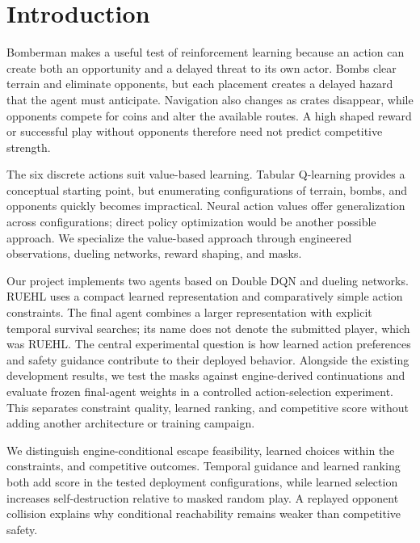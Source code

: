 \section{Introduction}
\label{sec:jesper-introduction}
Bomberman makes a useful test of reinforcement learning because an action
can create both an opportunity and a delayed threat to its own actor.
Bombs clear terrain and eliminate opponents, but each placement creates
a delayed hazard that the agent must anticipate. Navigation also changes
as crates disappear, while opponents compete for coins and alter the
available routes. A high shaped reward or successful play without
opponents therefore need not predict competitive strength.

The six discrete actions suit value-based learning. Tabular Q-learning
provides a conceptual starting point, but enumerating configurations of
terrain, bombs, and opponents quickly becomes impractical. Neural action
values offer generalization across configurations; direct policy optimization
would be another possible approach. We specialize the value-based approach
through engineered observations, dueling networks, reward shaping, and masks.

Our project implements two agents based on Double DQN and dueling
networks. RUEHL uses a compact learned representation and comparatively
simple action constraints. The final agent combines a larger representation
with explicit temporal survival searches; its name does not denote the
submitted player, which was RUEHL. The central experimental question
is how learned action preferences and safety guidance contribute to their
deployed behavior. Alongside the existing development results, we test the
masks against engine-derived continuations and evaluate frozen final-agent
weights in a controlled action-selection experiment. This separates
constraint quality, learned ranking, and competitive score without adding
another architecture or training campaign.

We distinguish engine-conditional escape feasibility, learned choices
within the constraints, and competitive outcomes. Temporal guidance and
learned ranking both add score in the tested deployment configurations,
while learned selection increases self-destruction relative to masked
random play. A replayed opponent collision explains why conditional
reachability remains weaker than competitive safety.
